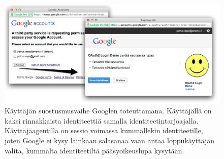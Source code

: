 \documentclass[finnish,gradu]{tktltiki}
\begin{document}
  \begin{figure}
    \centering
    \includegraphics[width=1.0\textwidth]{images/google_id_and_user_consent.jpg}
    \caption[OAuth-käyttäjäsuostumusvaihe Googlessa.]{Käyttäjän suostusmusvaihe Googlen toteuttamana. Käyttäjällä on kaksi rinnakkaista identiteettiä samalla identiteetintarjoajalla. Käyttäjäagentilla on sessio voimassa kummallekin identiteetille, joten Google ei kysy lainkaan salasanaa vaan antaa loppukäyttäjän valita, kummalta identiteetiltä pääsyoikeuslupa kysytään.}
    \label{fig:google_id_and_user_consent}
  \end{figure}
\end{document}
